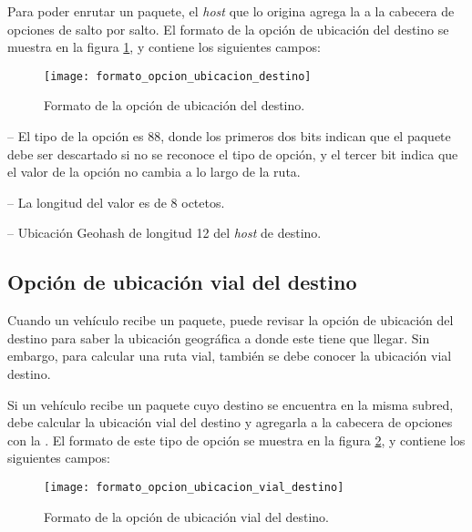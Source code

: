 Para poder enrutar un paquete, el \textit{host} que lo origina agrega la
 a la cabecera de opciones de salto
por salto. El formato de la opción de ubicación del destino se muestra en la
figura \ref{fig:formato_opcion_ubicacion_destino}, y contiene los siguientes
campos:

\begin{figure}[th!]
\centering
\texttt{[image: formato\_opcion\_ubicacion\_destino]}
\decoRule
\caption[Formato de la opción de ubicación del destino]{Formato de la opción de
ubicación del destino.}
\label{fig:formato_opcion_ubicacion_destino}
\end{figure}

 -- El tipo de la opción es 88, donde los primeros dos
bits indican que el paquete debe ser descartado si no se reconoce el tipo de
opción, y el tercer bit indica que el valor de la opción no cambia a lo largo
de la ruta.

 -- La longitud del valor es de 8 octetos.

 -- Ubicación Geohash de longitud 12 del
\textit{host} de destino.

\subsection{Opción de ubicación vial del destino}
\label{subsec:opcion_de_ubicacion_vial_del_destino}

Cuando un vehículo recibe un paquete, puede revisar la opción de ubicación del
destino para saber la ubicación geográfica a donde este tiene que llegar. Sin
embargo, para calcular una ruta vial, también se debe conocer la ubicación vial
destino.

Si un vehículo recibe un paquete cuyo destino se encuentra en la misma subred,
debe calcular la ubicación vial del destino y agregarla a la cabecera de
opciones con la . El formato de
este tipo de opción se muestra en la figura
\ref{fig:formato_opcion_ubicacion_vial_destino}, y contiene los siguientes
campos:

\begin{figure}[th!]
\centering
\texttt{[image: formato\_opcion\_ubicacion\_vial\_destino]}
\decoRule
\caption[Formato de la opción de ubicación vial del destino]{Formato de la
opción de ubicación vial del destino.}
\label{fig:formato_opcion_ubicacion_vial_destino}
\end{figure}

